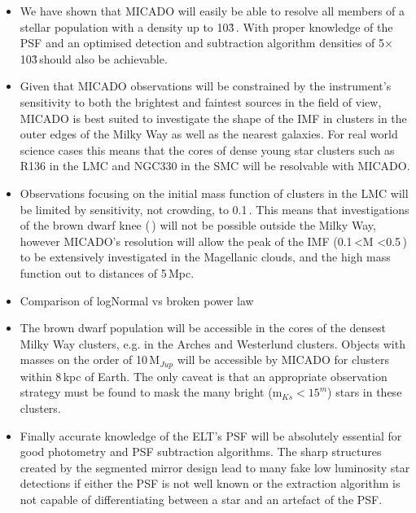 \begin{itemize}
    \item We have shown that MICADO will easily be able to resolve all members of a stellar population with a density up to 10\h3\,\spa. With proper knowledge of the PSF and an optimised detection and subtraction algorithm densities of 5$\times$10\h3\,\spa should also be achievable.

    \item Given that MICADO observations will be constrained by the instrument's sensitivity to both the brightest and faintest sources in the field of view, MICADO is best suited to investigate the shape of the IMF in clusters in the outer edges of the Milky Way as well as the nearest galaxies. For real world science cases this means that the cores of dense young star clusters such as R136 in the LMC and NGC330 in the SMC will be resolvable with MICADO.
    
    \item Observations focusing on the initial mass function of clusters in the LMC will be limited by sensitivity, not crowding, to 0.1\,\msun. This means that investigations of the brown dwarf knee (\,\msun) will not be possible outside the Milky Way, however MICADO's resolution will allow the peak of the IMF (0.1\,\msun\textless M \textless0.5\,\msune) to be extensively investigated in the Magellanic clouds, and the high mass function out to distances of 5\,Mpc.
    
    \item Comparison of logNormal vs broken power law
    
    \item The brown dwarf population will be accessible in the cores of the densest Milky Way clusters, e.g. in the Arches and Westerlund clusters. Objects with masses on the order of 10\,M$_{Jup}$ will be accessible by MICADO for clusters within 8\,kpc of Earth. The only caveat is that an appropriate observation strategy must be found to mask the many bright (m$_{Ks}<15^m$) stars in these clusters.
    
    \item Finally accurate knowledge of the ELT's PSF will be absolutely essential for good photometry and PSF subtraction algorithms. The sharp structures created by the segmented mirror design lead to many fake low luminosity star detections if either the PSF is not well known or the extraction algorithm is not capable of differentiating between a star and an artefact of the PSF.
    
\end{itemize}



